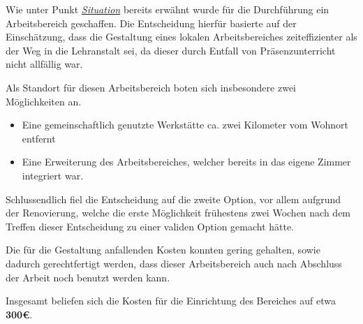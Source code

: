 Wie unter Punkt \hyperref[covid]{\textit{Situation}} bereits erwähnt wurde für die Durchführung ein Arbeitsbereich geschaffen.
Die Entscheidung hierfür basierte auf der Einschätzung, dass die Gestaltung eines lokalen Arbeitsbereiches zeiteffizienter als der Weg in die Lehranstalt sei, da dieser durch Entfall von Präsenzunterricht nicht allfällig war.

Als Standort für diesen Arbeitsbereich boten sich insbesondere zwei Möglichkeiten an.

\begin{itemize}
    \item Eine gemeinschaftlich genutzte Werkstätte ca. zwei Kilometer vom Wohnort entfernt
    \item Eine Erweiterung des Arbeitsbereiches, welcher bereits in das eigene Zimmer integriert war.
\end{itemize}

Schlussendlich fiel die Entscheidung auf die zweite Option, vor allem aufgrund der Renovierung, welche die erste Möglichkeit frühestens zwei Wochen nach dem Treffen dieser Entscheidung zu einer validen Option gemacht hätte.

Die für die Gestaltung anfallenden Kosten konnten gering gehalten, sowie dadurch gerechtfertigt werden, dass dieser Arbeitsbereich auch nach Abschluss der Arbeit noch benutzt werden kann.

Insgesamt beliefen sich die Kosten für die Einrichtung des Bereiches auf etwa \textbf{300€}.
